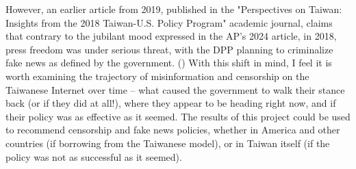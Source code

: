 However, an earlier article from 2019, published in the "Perspectives on Taiwan: Insights from the 2018 Taiwan-U.S. Policy Program" academic journal, claims
that contrary to the jubilant mood expressed in the AP's 2024 article, in 2018, press freedom was under serious threat, with the DPP planning to criminalize
fake news as defined by the government. (\cite{perspectives-taiwan}) With this shift in mind, I feel it is worth examining the trajectory of misinformation
and censorship on the Taiwanese Internet over time -- what caused the government to walk their stance back (or if they did at all!), where they appear to be
heading right now, and if their policy was as effective as it seemed. The results of this project could be used to recommend censorship and fake news policies,
whether in America and other countries (if borrowing from the Taiwanese model), or in Taiwan itself (if the policy was not as successful as it seemed).